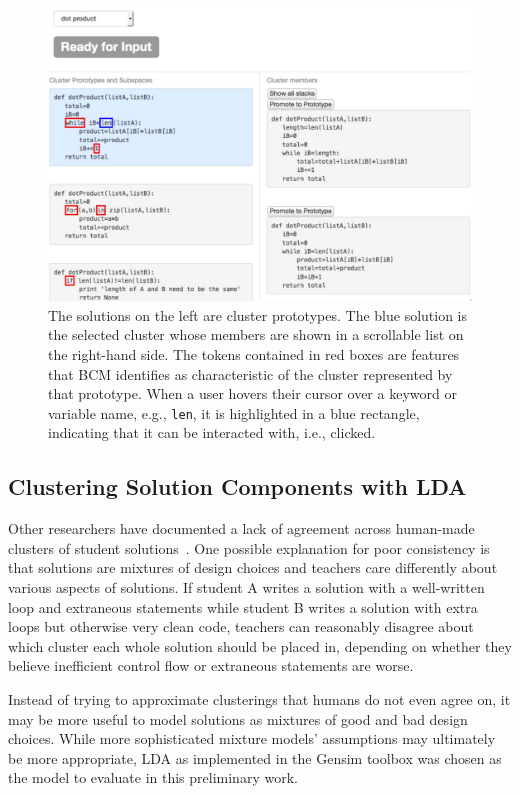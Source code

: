 \begin{figure}[ht]
\includegraphics[width=0.75\columnwidth]{Body/figures/grovercode/overcode_ibcm}
\caption{The solutions on the left are cluster prototypes. The blue solution is the selected cluster whose members are shown in a scrollable list on the right-hand side. The tokens contained in red boxes are features that BCM identifies as characteristic of the cluster represented by that prototype. When a user hovers their cursor over a keyword or variable name, e.g., \texttt{len}, it is highlighted in a blue rectangle, indicating that it can be interacted with, i.e., clicked.}
\label{overcode_ibcm}
\end{figure} 

\subsection{Clustering Solution Components with LDA}

Other researchers have documented a lack of agreement across human-made clusters of student solutions~\cite{berkeleymastersthesis}. One possible explanation for poor consistency is that solutions are mixtures of design choices and teachers care differently about various aspects of solutions. If student A writes a solution with a well-written loop and extraneous statements while student B writes a solution with extra loops but otherwise very clean code, teachers can reasonably disagree about which cluster each whole solution should be placed in, depending on whether they believe inefficient control flow or extraneous statements are worse.

Instead of trying to approximate clusterings that humans do not even agree on, it may be more useful to model solutions as mixtures of good and bad design choices. While more sophisticated mixture models' assumptions may ultimately be more appropriate, LDA \cite{lda} as implemented in the Gensim toolbox \cite{gensim} was chosen as the model to evaluate in this preliminary work. 

